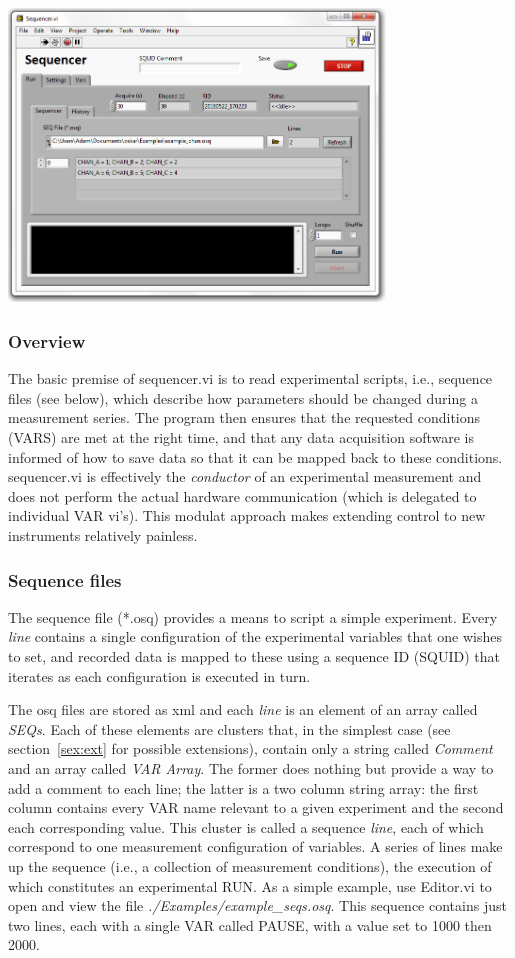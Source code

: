 \documentclass[10pt,a4paper]{article}
\begin{document}
\includegraphics[width=0.75\textwidth]{images/sequencer.png}

\subsubsection{Overview}

The basic premise of sequencer.vi is to read experimental scripts, i.e., sequence files (see below), which describe how parameters should be changed during a measurement series.  The program then ensures that the requested conditions (VARS) are met at the right time, and that any data acquisition software is informed of how to save data so that it can be mapped back to these conditions.  sequencer.vi is effectively the \emph{conductor} of an experimental measurement and does not perform the actual hardware communication (which is delegated to individual VAR vi's). This modulat approach makes extending control to new instruments relatively painless.

\subsubsection{Sequence files}
The sequence file (*.osq) provides a means to script a simple experiment. Every \emph{line} contains a single configuration of the experimental variables that one wishes to set, and recorded data is mapped to these using a sequence ID (SQUID) that iterates as each configuration is executed in turn.

The osq files are stored as xml and each \emph{line} is an element of an array called \emph{SEQs}.  Each of these elements are clusters that, in the simplest case (see section~\ref{sex:ext} for possible extensions), contain only a string called \emph{Comment} and an array called \emph{VAR Array}. The former does nothing but provide a way to add a comment to each line; the latter is a two column string array: the first column contains every VAR name relevant to a given experiment and the second each corresponding value.  This cluster is called  a sequence \emph{line}, each of which correspond to one measurement configuration of variables.  A series of lines make up the sequence (i.e., a collection of measurement conditions), the execution of which constitutes an experimental RUN.  As a simple example, use Editor.vi to open and view the file \emph{./Examples/example\_seqs.osq}.  This sequence contains just two lines, each with a single VAR called PAUSE, with a value set to 1000 then 2000.
\end{document}
